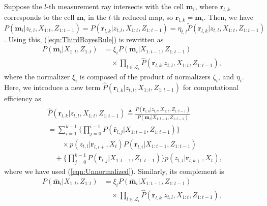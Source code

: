 \documentclass[letterpaper, 10pt, conference]{ieeeconf}
\newcommand{\refeqn}[1]{(\ref{eqn:#1})}
\begin{document}
Suppose the $l$-th measurement ray intersects with the cell $\mathbf{m}_i$, where $\mathbf{r}_{l,k}$ corresponds to the cell $\mathbf{m}_i$ in the $l$-th reduced map, so $\mathbf{r}_{l,k}=\mathbf{m}_i$.  Then, we have $P(\mathbf{m}_i|z_{t,l},X_{1:t},Z_{1:t-1})=P(\mathbf{r}_{l,k}|z_{t,l},X_{1:t},Z_{1:t-1})=\eta_{t,l}\tilde P(\mathbf{r}_{l,k}|z_{t,l},X_{1:t},Z_{1:t-1})$. 
%
%
Using this, \refeqn{ThirdBayesRule} is rewritten as
\begin{align}
P(\mathbf{m}_i|X_{1:t},Z_{1:t})
&=\xi_i P(\mathbf{m}_i|{X_{1:t-1}},Z_{1:t-1})\nonumber\\&\quad\times
\prod_{l\in\mathcal L_i}
\hat P(\mathbf{r}_{l,k}|z_{t,l},X_{1:t},Z_{1:t-1})
,
\label{eqn:ISM_Fusion}
\end{align}
where the normalizer $\xi_i$ is composed of the product of normalizers $\zeta_i$, and $\eta_i$. Here, we introduce a new term $\hat P(\mathbf{r}_{l,k}|z_{t,l},X_{1:t},Z_{1:t-1})$ for computational efficiency as
\begin{align}
&\hat P(\mathbf{r}_{l,k}|z_{t,l},X_{1:t},Z_{1:t-1})
\triangleq \frac{\tilde P(\mathbf{r}_{l,k}|z_{t,l},X_{1:t},Z_{1:t-1})}{P(\mathbf{m}_i|X_{1:t-1},Z_{1:t-1})}
\nonumber\\&=
\sum_{i=1}^{k-1}\bigg\{\prod_{j=0}^{i-1}P(\bar{\mathbf{r}}_{l,j}|X_{1:t-1},Z_{1:t-1})\bigg\}\nonumber\\&\quad\quad\times p(z_{t,l}|\mathbf{r}_{l,i+},X_t)P(\mathbf{r}_{l,i}|X_{1:t-1},Z_{1:t-1})
\nonumber\\&\quad
+
\bigg\{\prod_{j=0}^{k-1}P(\bar{\mathbf{r}}_{l,j}|X_{1:t-1},Z_{1:t-1})\bigg\}p(z_{t,l}|\mathbf{r}_{l,k+},X_t),
\end{align}
where we have used \refeqn{Unnormalized}. Similarly, its complement is
\begin{align}
P(\bar{\mathbf{m}}_i|{{X_{1:t}}},Z_{1:t})
&=\xi_i P(\bar{\mathbf{m}}_i|{X_{1:t-1}},Z_{1:t-1})
\nonumber\\&\quad\times\prod_{l\in\mathcal L_i}
\hat P(\bar{\mathbf{r}}_{l,k}|z_{t,l},X_{1:t},Z_{1:t-1})
,
\label{eqn:ISM_Bar_Fusion}
\end{align}
\end{document}
